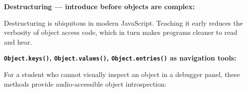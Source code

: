 \documentclass[
  justified,
  openright,
]{tufte-book}
\newcommand{\AttributeTok}[1]{\textcolor{DarkSlateGray}{#1}}
\newcommand{\BuiltInTok}[1]{#1}
\newcommand{\CommentTok}[1]{\textcolor{MidGray}{#1}}
\newcommand{\DataTypeTok}[1]{\textcolor{Purple}{#1}}
\newcommand{\DecValTok}[1]{\textcolor{Purple}{#1}}
\newcommand{\FunctionTok}[1]{\textcolor{BrandBlue}{#1}}
\newcommand{\KeywordTok}[1]{\textcolor{BrandBlue}{#1}}
\newcommand{\NormalTok}[1]{#1}
\newcommand{\OperatorTok}[1]{\textcolor{DarkGray}{#1}}
\newcommand{\SpecialCharTok}[1]{\textcolor{Teal}{#1}}
\newcommand{\StringTok}[1]{\textcolor{Teal}{#1}}
\newcommand{\VerbatimStringTok}[1]{\textcolor{Teal}{#1}}
\newenvironment{Shaded}{%
  \begin{snugshade}
}{%
  \end{snugshade}
}
\begin{document}
\textbf{Destructuring --- introduce before objects are complex:}

\begin{Shaded}
\end{Shaded}

Destructuring is ubiquitous in modern JavaScript. Teaching it early
reduces the verbosity of object access code, which in turn makes
programs cleaner to read and hear.

\textbf{\texttt{Object.keys()}, \texttt{Object.values()},
\texttt{Object.entries()} as navigation tools:}

For a student who cannot visually inspect an object in a debugger panel,
these methods provide audio-accessible object introspection:
\end{document}
